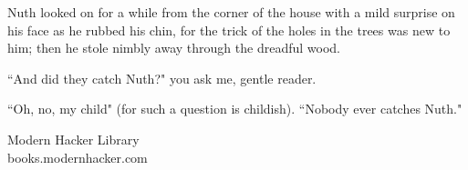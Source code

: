 \documentclass[12pt]{article}
\begin{document}
Nuth looked on for a while from the corner of the house with a mild
surprise on his face as he rubbed his chin, for the trick of the holes
in the trees was new to him; then he stole nimbly away through the
dreadful wood.

``And did they catch Nuth?" you ask me, gentle reader.

``Oh, no, my child" (for such a question is childish). ``Nobody ever
catches Nuth."




\vfill
\begin{center}
{\selectfont 
Modern Hacker Library\\books.modernhacker.com}
\end{center}
\end{document}
